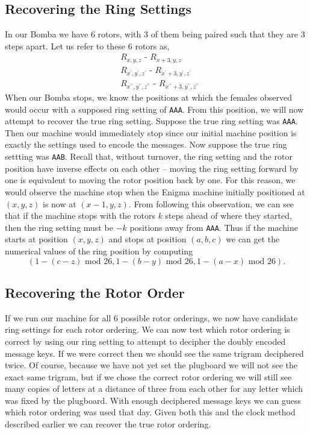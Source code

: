 \subsection{Recovering the Ring Settings}
In our Bomba we have 6 rotors, with 3 of them being paired such that they are 3 steps apart. Let us refer to these 6 rotors as,
\begin{align*}
	 & R_{x,y,z} \texttt{ - } R_{x+3,y,z}                                                                                           \\
	 & R_{x^\prime,y^\prime,z^\prime} \texttt{ - } R_{x^\prime+3,y^\prime,z^\prime}                                                 \\
	 & R_{x^{\prime\prime},y^{\prime\prime},z^{\prime\prime}} \texttt{ - } R_{x^{\prime\prime}+3,y^{\prime\prime},z^{\prime\prime}}
\end{align*}
When our Bomba stops, we know the positions at which the females observed would occur with a supposed ring setting of \texttt{AAA}. From this position, we will now attempt to recover the true ring setting. Suppose the true ring setting was \texttt{AAA}. Then our machine would immediately stop since our initial machine position is exactly the settings used to encode the messages. Now suppose the true ring settting was \texttt{AAB}. Recall that, without turnover, the ring setting and the rotor position have inverse effects on each other -- moving the ring setting forward by one is equivalent to moving the rotor position back by one. For this reason, we would observe the machine stop when the Enigma machine initially positioned at $(x,y,z)$ is now at $(x-1,y,z)$. From following this observation, we can see that if the machine stops with the rotors $k$ steps ahead of where they started, then the ring setting must be $-k$ positions away from \texttt{AAA}. Thus if the machine starts at position $(x,y,z)$ and stops at position $(a,b,c)$ we can get the numerical values of the ring position by computing
\[
	(1 - (c- z)\text{ mod }26, 1 - (b- y)\text{ mod }26, 1 - (a- x)\text{ mod }26).
\]

\subsection{Recovering the Rotor Order}
If we run our machine for all $6$ possible rotor orderings, we now have candidate ring settings for each rotor ordering. We can now test which rotor ordering is correct by using our ring setting to attempt to decipher the doubly encoded message keys. If we were correct then we should see the same trigram deciphered twice. Of course, because we have not yet set the plugboard we will not see the exact same trigram, but if we chose the correct rotor ordering we will still see many copies of letters at a distance of three from each other for any letter which was fixed by the plugboard. With enough deciphered message keys we can guess which rotor ordering was used that day. Given both this and the clock method described earlier we can recover the true rotor ordering.

